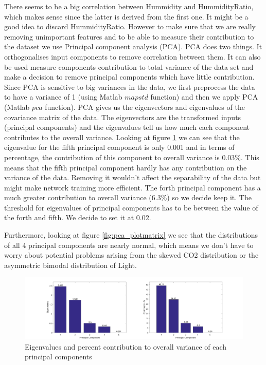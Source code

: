 \documentclass[a4paper, 11pt]{article}
\begin{document}
There seems to be a big correlation between Hummidity and HummidityRatio, which makes sense since the latter is derived from the first one. It might be a good idea to discard HummidityRatio. However to make sure that we are really removing unimportant features and to be able to measure their contribution to the dataset we use Principal component analysis (PCA). PCA does two things. It orthogonalises input components to remove correlation between them. It can also be used measure components contribution to total variance of the data set and make a decision to remove principal components which have little contribution. Since PCA is sensitive to big variances in the data, we first preprocess the data to have a variance of 1 (using Matlab $mapstd$ function) and then we apply PCA (Matlab $pca$ function). PCA gives us the eigenvectors and eigenvalues of the covariance matrix of the data. The eigenvectors are the transformed inputs (principal components) and the eigenvalues tell us how much each component contributes to the overall variance. Looking at figure \ref{fig:eigenvalues} we can see that the eigenvalue for the fifth principal component is only 0.001 and in terms of percentage, the contribution of this component to overall variance is 0.03\%. This means that the fifth principal component hardly has any contribution on the variance of the data. Removing it wouldn't affect the separability of the data but might make network training more efficient. The forth principal component has a much greater contribution to overall variance (6.3\%) so we decide keep it. The threshold for eigenvalues of principal components has to be between the value of the forth and fifth. We decide to set it at 0.02.


Furthermore, looking at figure \ref{fig:pca_plotmatrix} we see that the distributions of all 4 principal components are nearly normal, which means we don't have to worry about potential problems arising from the skewed CO2 distribution or the asymmetric bimodal distribution of Light.

\begin{figure}[h]
  	\centering
    \includegraphics[width=1\textwidth]{../figures/eigenvalues.png}
    \caption{Eigenvalues and percent contribution to overall variance of each principal components}
    \label{fig:eigenvalues}
\end{figure}
\end{document}
